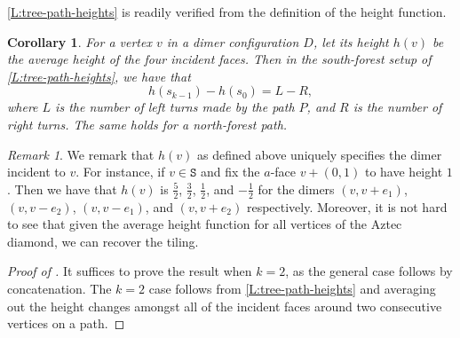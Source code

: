 \documentclass[11pt,twoside]{amsart}
\theoremstyle{plain}
\newtheorem{cor}[thm]{Corollary}
\numberwithin{quest}{section}
\theoremstyle{remark}
\newtheorem{rem}{Remark}
\numberwithin{rem}{section}
\theoremstyle{definition}
\begin{document}
	\cref{L:tree-path-heights} is readily verified from the definition of the height function.
	
	\begin{cor}
		\label{C:vertex-heights}
		For a vertex $v$ in a dimer configuration $D$, let its height $h(v)$ be the average height of the four incident faces. Then in the south-forest setup of \cref{L:tree-path-heights}, we have that
		$$
		h(s_{k-1}) - h(s_0) = L - R,
		$$
		where $L$ is the number of left turns made by the path $P$, and $R$ is the number of right turns. The same holds for a north-forest path.
	\end{cor}
	
	
	\begin{rem}\label{rem:average-height}
		We remark that $h(v)$ as defined above uniquely specifies the dimer incident to $v$. For instance, if $v\in \mathtt{S}$ and fix the $a$-face $v+(0,1)$ to have height $1$. Then we have that $h(v)$ is $\frac{5}{2}$, $\frac{3}{2}$, $\frac{1}{2}$, and $-\frac{1}{2}$ for the dimers $(v,v+e_1)$, $(v,v-e_2)$, $(v,v-e_1)$, and $(v,v+e_2)$ respectively. Moreover, it is not hard to see that given the average height function for all vertices of the Aztec diamond, we can recover the tiling. 
	\end{rem}
	
	
	
	
	
	\begin{proof}[Proof of ]
		It suffices to prove the result when $k = 2$, as the general case follows by concatenation. The $k=2$ case follows from \cref{L:tree-path-heights} and averaging out the height changes amongst all of the incident faces around two consecutive vertices on a path. 
	\end{proof}
	
\end{document}
